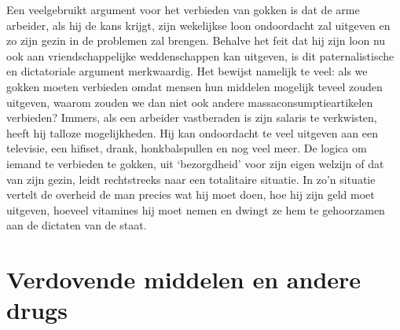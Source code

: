 \documentclass[
  a5paper,
  smalldemyvopaper,10pt,twoside,onecolumn,openright,extrafontsizes,hidelinks]{memoir}
\begin{document}
Een veelgebruikt argument voor het verbieden van gokken is dat de arme
arbeider, als hij de kans krijgt, zijn wekelijkse loon ondoordacht zal
uitgeven en zo zijn gezin in de problemen zal brengen. Behalve het feit
dat hij zijn loon nu ook aan vriendschappelijke weddenschappen kan
uitgeven, is dit paternalistische en dictatoriale argument merkwaardig.
Het bewijst namelijk te veel: als we gokken moeten verbieden omdat
mensen hun middelen mogelijk teveel zouden uitgeven, waarom zouden we
dan niet ook andere massaconsumptieartikelen verbieden? Immers, als een
arbeider vastberaden is zijn salaris te verkwisten, heeft hij talloze
mogelijkheden. Hij kan ondoordacht te veel uitgeven aan een televisie,
een hifiset, drank, honkbalspullen en nog veel meer. De logica om iemand
te verbieden te gokken, uit `bezorgdheid' voor zijn eigen welzijn of dat
van zijn gezin, leidt rechtstreeks naar een totalitaire situatie. In
zo'n situatie vertelt de overheid de man precies wat hij moet doen, hoe
hij zijn geld moet uitgeven, hoeveel vitamines hij moet nemen en dwingt
ze hem te gehoorzamen aan de dictaten van de staat.

\section{Verdovende middelen en andere
drugs}\label{verdovende-middelen-en-andere-drugs}
\end{document}
